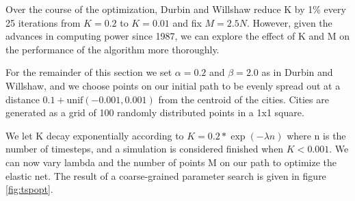 \documentclass{article}
\begin{document}
Over the course of the optimization, Durbin and Willshaw reduce K by 1\% every 25 iterations from $K=0.2$ to $K=0.01$ and fix $M = 2.5N$. However, given the advances in computing power since 1987, we can explore the effect of K and M on the performance of the algorithm more thoroughly.

For the remainder of this section we set $\alpha = 0.2$ and $\beta = 2.0$ as in Durbin and Willshaw, and we choose points on our initial path to be evenly spread out at a distance $0.1+\text{unif}(-0.001, 0.001)$ from the centroid of the cities. Cities are generated as a grid of 100 randomly distributed points in a 1x1 square.

We let K decay exponentially according to $K = 0.2*\exp{(-\lambda n)}$ where n is the number of timesteps, and a simulation is considered finished when $K < 0.001$. We can now vary lambda and the number of points M on our path to optimize the elastic net. The result of a coarse-grained parameter search is given in figure \ref{fig:tspopt}.  
\end{document}
